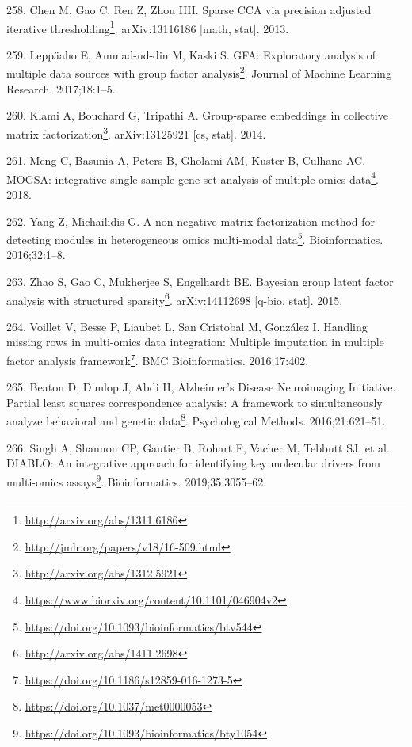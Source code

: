 \documentclass[
  a4paper,
]{book}
\DeclareRobustCommand{\href}[2]{#2\footnote{\url{#1}}}
\newlength{\cslhangindent}
\newlength{\cslentryspacingunit} %
\newenvironment{CSLReferences}[2] %
 {%
  \setlength{\parindent}{0pt}
  \ifodd #1
  \let\oldpar\par
  \def\par{\hangindent=\cslhangindent\oldpar}
  \fi
  \setlength{\parskip}{#2\cslentryspacingunit}
 }%
 {}
\begin{document}
\begin{CSLReferences}{0}{0}
\leavevmode{}%
258. Chen M, Gao C, Ren Z, Zhou HH. \href{http://arxiv.org/abs/1311.6186}{Sparse CCA via precision adjusted iterative thresholding}. arXiv:13116186 {[}math, stat{]}. 2013.

\leavevmode{}%
259. Leppäaho E, Ammad-ud-din M, Kaski S. \href{http://jmlr.org/papers/v18/16-509.html}{GFA: Exploratory analysis of multiple data sources with group factor analysis}. Journal of Machine Learning Research. 2017;18:1--5.

\leavevmode{}%
260. Klami A, Bouchard G, Tripathi A. \href{http://arxiv.org/abs/1312.5921}{Group-sparse embeddings in collective matrix factorization}. arXiv:13125921 {[}cs, stat{]}. 2014.

\leavevmode{}%
261. Meng C, Basunia A, Peters B, Gholami AM, Kuster B, Culhane AC. \href{https://www.biorxiv.org/content/10.1101/046904v2}{MOGSA: integrative single sample gene-set analysis of multiple omics data}. 2018.

\leavevmode{}%
262. Yang Z, Michailidis G. \href{https://doi.org/10.1093/bioinformatics/btv544}{A non-negative matrix factorization method for detecting modules in heterogeneous omics multi-modal data}. Bioinformatics. 2016;32:1--8.

\leavevmode{}%
263. Zhao S, Gao C, Mukherjee S, Engelhardt BE. \href{http://arxiv.org/abs/1411.2698}{Bayesian group latent factor analysis with structured sparsity}. arXiv:14112698 {[}q-bio, stat{]}. 2015.

\leavevmode{}%
264. Voillet V, Besse P, Liaubet L, San Cristobal M, González I. \href{https://doi.org/10.1186/s12859-016-1273-5}{Handling missing rows in multi-omics data integration: Multiple imputation in multiple factor analysis framework}. BMC Bioinformatics. 2016;17:402.

\leavevmode{}%
265. Beaton D, Dunlop J, Abdi H, Alzheimer's Disease Neuroimaging Initiative. \href{https://doi.org/10.1037/met0000053}{Partial least squares correspondence analysis: A framework to simultaneously analyze behavioral and genetic data}. Psychological Methods. 2016;21:621--51.

\leavevmode{}%
266. Singh A, Shannon CP, Gautier B, Rohart F, Vacher M, Tebbutt SJ, et al. \href{https://doi.org/10.1093/bioinformatics/bty1054}{DIABLO: An integrative approach for identifying key molecular drivers from multi-omics assays}. Bioinformatics. 2019;35:3055--62.


\end{CSLReferences}
\end{document}
